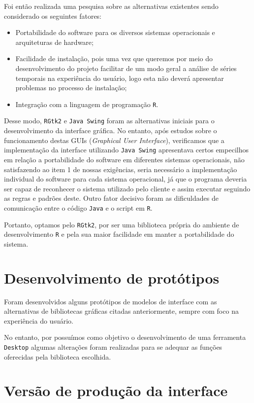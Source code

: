 Foi então realizada uma pesquisa sobre as alternativas existentes sendo considerado os seguintes fatores:

\begin{itemize}
\item Portabilidade do software para os diversos sistemas operacionais e arquiteturas de hardware; 
\item Facilidade de instalação, pois uma vez que queremos por meio do desenvolvimento do projeto facilitar de um modo geral a análise de séries temporais na experiência do usuário, logo esta não deverá apresentar problemas no processo de instalação;
\item Integração com a linguagem de programação \texttt R.
\end{itemize}

Desse modo, \texttt{RGtk2} e \texttt{Java Swing} foram as alternativas iniciais para o desenvolvimento da interface gráfica. 
No entanto, após estudos sobre o funcionamento destas GUIs (\textit{Graphical User Interface}), verificamos que a implementação da interface utilizando \texttt{Java Swing} apresentava certos empecilhos em relação a portabilidade do software em diferentes sistemas operacionais, não satisfazendo ao item 1 de nossas exigências, seria necessário a implementação individual do software para cada sistema operacional, já que o programa deveria ser capaz de  reconhecer o sistema utilizado pelo cliente e assim executar seguindo as regras e padrões deste. Outro fator decisivo foram as dificuldades de comunicação entre o código \texttt{Java} e o script em \texttt{R}.

Portanto, optamos pelo \texttt{RGtk2}, por ser uma biblioteca própria do ambiente de desenvolvimento \texttt R e pela sua maior facilidade em manter a portabilidade do sistema.

\section{Desenvolvimento de protótipos}
 
Foram desenvolvidos alguns protótipos de modelos de interface com as alternativas de bibliotecas gráficas citadas anteriormente, sempre com foco na experiência do usuário. 

No entanto, por possuímos como objetivo o desenvolvimento de uma ferramenta \texttt{Desktop} algumas alterações foram realizadas para se adequar as funções oferecidas pela biblioteca escolhida.

\section{Versão de produção da interface}

